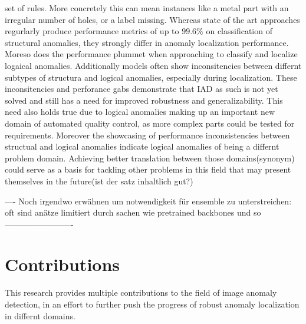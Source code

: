 set of rules. More concretely this can mean instances like a metal part with an irregular number of holes, or a label missing. Whereas 
state of the art approaches regurlarly produce performance metrics of up to $99.6 \% $ on classification of structural anomalies, they 
strongly differ in anomaly localization performance. Moreso does the performance plummet when approaching to classify and localize logaical 
anomalies. Additionally models often show inconsitencies between differnt subtypes of structura and logical anomalies, especially during 
localization. These inconsitencies and perforance gabs demonstrate that IAD as such is not yet solved and still has a need for improved 
robustness and generalizability. This need also holds true due to logical anomalies making up an important new domain of automated 
quality control, as more complex parts could be tested for requirements. Moreover the showcasing of performance inconsistencies between 
structual and logical anomalies indicate logical anomalies of being a differnt problem domain. Achieving better translation between those 
domains(synonym) could serve as a basis for tackling other problems in this field that may present themselves in the future(ist der satz 
inhaltlich gut?)

---- Noch irgendwo erwähnen um notwendigkeit für ensemble zu unterstreichen: oft sind anätze limitiert durch sachen wie pretrained backbones 
und so -------------------------

\section{Contributions}
\label{sec:contributions}
This research provides multiple contributions to the field of image anomaly detection, in an effort to further push the progress of 
robust anomaly localization in differnt domains. 

